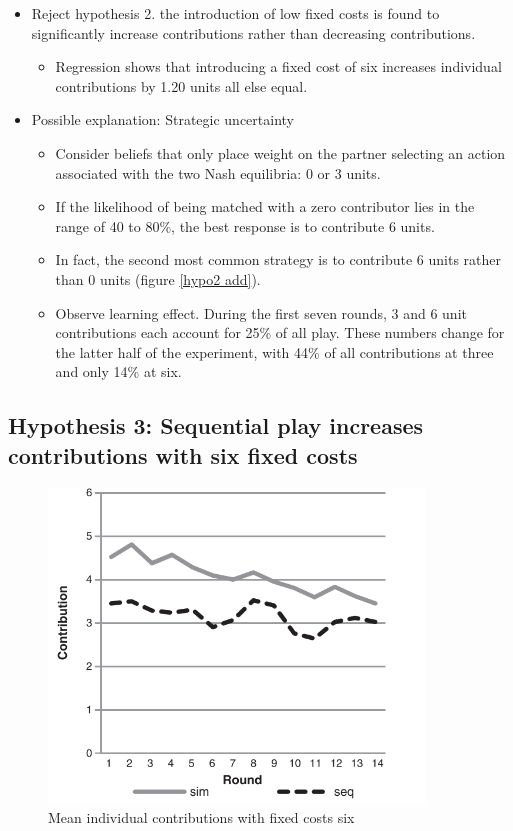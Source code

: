 \documentclass[../root]{subfiles}
\begin{document}
    \begin{itemize}
        \item Reject hypothesis 2. the introduction of low fixed costs is found to significantly increase contributions rather than decreasing contributions.
        \begin{itemize}
            \item Regression shows that introducing a fixed cost of six increases individual contributions by 1.20 units all else equal.
        \end{itemize}
        \item Possible explanation: Strategic uncertainty
        \begin{itemize}
            \item Consider beliefs that only place weight on the partner selecting an action associated with the two Nash equilibria: 0 or 3 units.
            \item If the likelihood of being matched with a zero contributor lies in the range of 40 to 80\%, the best response is to contribute 6 units.
            \item In fact, the second most common strategy is to contribute 6 units rather than 0 units (figure \ref{hypo2 add}).
            \item Observe learning effect. During the first seven rounds, 3 and 6 unit contributions each account for 25\% of all play. These numbers change for the latter half of the experiment, with 44\% of all contributions at three and only 14\% at six.
        \end{itemize}
    \end{itemize}

    \subsection{Hypothesis 3: Sequential play increases contributions with six fixed costs}

    \begin{figure}[H]
        \centering
        \includegraphics[width = 10cm]{0605kato/h3.png}
        \caption{Mean individual contributions with fixed costs six}
        \label{hypo3}
    \end{figure}
\end{document}
